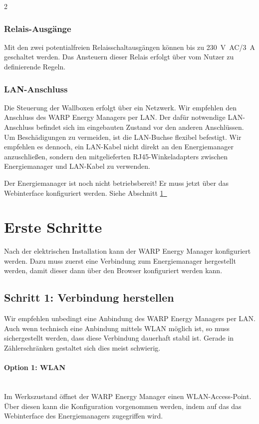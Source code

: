 \documentclass[a4paper,10pt]{article}
\newcommand{\hint}[1]{\begin{tcolorbox}[colback=boxgray,colframe=black,coltext=
white,title=Hinweis,left*=2mm,right*=2mm,boxsep=1mm,bottom=1mm,top=1mm]#1\end{tcolorbox}}
\newcommand*{\fullref}[1]{Abschnitt \hyperref[{#1}]{\ref*{#1}~\nameref*{#1}}}
\begin{document}
\begin{multicols*}{2}
	\subsubsection{Relais-Ausgänge}
	Mit den zwei potentialfreien Relaisschaltausgängen können bis zu \SI{230}{\volt AC}/\SI{3}{\ampere} geschaltet
	werden. Das Ansteuern dieser Relais erfolgt über vom Nutzer zu definierende Regeln.

	\subsubsection{LAN-Anschluss}
	Die Steuerung der Wallboxen erfolgt über ein Netzwerk. Wir empfehlen den
	Anschluss des WARP Energy Managers per LAN. Der dafür notwendige LAN-Anschluss
	befindet sich im eingebauten Zustand vor den anderen Anschlüssen. Um Beschädigungen
	zu vermeiden, ist die LAN-Buchse flexibel befestigt. Wir empfehlen es dennoch, ein LAN-Kabel
	nicht direkt an den Energiemanager anzuschließen, sondern den mitgelieferten RJ45-Winkeladapters zwischen Energiemanager und LAN-Kabel zu verwenden.

	\hint{Der Energiemanager ist noch nicht betriebsbereit! Er muss jetzt über das Webinterface konfiguriert werden. Siehe \fullref{setup}}

	\vfill
	\null
	\newpage
	\section{Erste Schritte}
	\label{setup}

	Nach der elektrischen Installation kann der WARP Energy Manager konfiguriert
	werden. Dazu muss zuerst eine Verbindung zum Energiemanager hergestellt werden,
	damit dieser dann über den Browser konfiguriert werden kann.

	\subsection{Schritt 1: Verbindung herstellen}


	\hint{Wir empfehlen unbedingt eine Anbindung des WARP Energy Managers per
	LAN. Auch wenn technisch eine Anbindung mittels WLAN möglich ist, so muss
	sichergestellt werden, dass diese Verbindung dauerhaft stabil ist. Gerade in
	Zählerschränken gestaltet sich dies meist schwierig.}

	\paragraph{Option 1: WLAN}\ \\
	Im Werkszustand öffnet der WARP Energy Manager einen WLAN-Access-Point. Über diesen kann
	die Konfiguration vorgenommen werden, indem auf das das Webinterface des
	Energiemanagers zugegriffen wird.


\end{multicols*}
\end{document}
